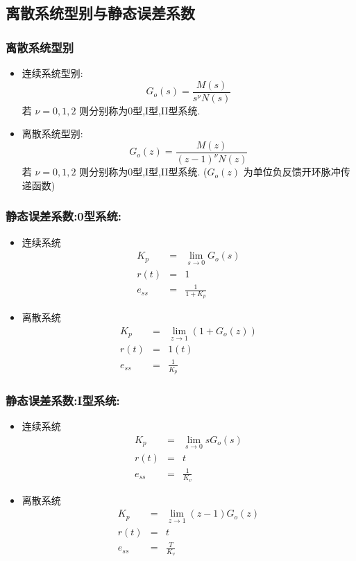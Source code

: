 \documentclass[table]{article}
\begin{document}
\subsection{离散系统型别与静态误差系数}
\label{sec-6-2}
\begin{frame}
\frametitle{离散系统型别}
\label{sec-6-2-1}

\begin{itemize}
\item 连续系统型别:  
       \[G_o(s)=\frac{M(s)}{s^{\nu}N(s)}\]  
      若  $\nu=0,1,2$  则分别称为0型,I型,II型系统.
\item <2->离散系统型别:  
       \[G_o(z)=\frac{M(z)}{(z-1)^{\nu}N(z)}\]  
      若  $\nu=0,1,2$  则分别称为0型,I型,II型系统.
       ($G_o(z)$  为单位负反馈开环脉冲传递函数)
\end{itemize}
\end{frame}
\begin{frame}
\frametitle{静态误差系数:0型系统:}
\label{sec-6-2-2}
\begin{itemize}

\item 连续系统
\label{sec-6-2-2-1}%
\begin{eqnarray*}
K_p &=& \lim_{s\rightarrow 0}G_o(s)  \\
r(t)&=& 1 \\
e_{ss} &=& \frac{1}{1+K_p} 
\end{eqnarray*}

\item 离散系统
\label{sec-6-2-2-2}%
\begin{eqnarray*}
K_p &=& \lim_{z\rightarrow 1}(1+G_o(z))  \\
r(t)&=& 1(t) \\
e_{ss} &=& \frac{1}{K_p} 
\end{eqnarray*}
\end{itemize} %
\end{frame}
\begin{frame}
\frametitle{静态误差系数:I型系统:}
\label{sec-6-2-3}
\begin{itemize}

\item 连续系统
\label{sec-6-2-3-1}%
\begin{eqnarray*}
K_p &=& \lim_{s\rightarrow 0}sG_o(s)  \\
r(t)&=& t \\
e_{ss} &=& \frac{1}{K_v} 
\end{eqnarray*}

\item 离散系统
\label{sec-6-2-3-2}%
\begin{eqnarray*}
K_p &=& \lim_{z\rightarrow 1} (z-1)G_o(z)  \\
r(t)&=& t \\
e_{ss} &=& \frac{T}{K_v} 
\end{eqnarray*}
\end{itemize} %
\end{frame}
\end{document}
